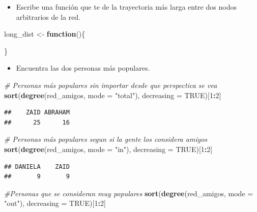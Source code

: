 \documentclass[
]{article}
\newenvironment{Shaded}{\begin{snugshade}}{\end{snugshade}}
\newcommand{\AttributeTok}[1]{\textcolor[rgb]{0.13,0.29,0.53}{#1}}
\newcommand{\CommentTok}[1]{\textcolor[rgb]{0.56,0.35,0.01}{\textit{#1}}}
\newcommand{\ConstantTok}[1]{\textcolor[rgb]{0.56,0.35,0.01}{#1}}
\newcommand{\ControlFlowTok}[1]{\textcolor[rgb]{0.13,0.29,0.53}{\textbf{#1}}}
\newcommand{\DecValTok}[1]{\textcolor[rgb]{0.00,0.00,0.81}{#1}}
\newcommand{\FunctionTok}[1]{\textcolor[rgb]{0.13,0.29,0.53}{\textbf{#1}}}
\newcommand{\NormalTok}[1]{#1}
\newcommand{\OtherTok}[1]{\textcolor[rgb]{0.56,0.35,0.01}{#1}}
\newcommand{\SpecialCharTok}[1]{\textcolor[rgb]{0.81,0.36,0.00}{\textbf{#1}}}
\newcommand{\StringTok}[1]{\textcolor[rgb]{0.31,0.60,0.02}{#1}}
\providecommand{\tightlist}{%
  \setlength{\itemsep}{0pt}\setlength{\parskip}{0pt}}
\begin{document}
\begin{itemize}
\tightlist
\item
  Escribe una función que te de la trayectoria más larga entre dos nodos
  arbitrarios de la red.
\end{itemize}

\begin{Shaded}
\begin{Highlighting}[]
\NormalTok{long\_dist }\OtherTok{\textless{}{-}} \ControlFlowTok{function}\NormalTok{()\{}
  
\NormalTok{\}}
\end{Highlighting}
\end{Shaded}

\begin{itemize}
\tightlist
\item
  Encuentra las dos personas más populares.
\end{itemize}

\begin{Shaded}
\begin{Highlighting}[]
\CommentTok{\# Personas más populares sin importar desde que perspectica se vea}
\FunctionTok{sort}\NormalTok{(}\FunctionTok{degree}\NormalTok{(red\_amigos, }\AttributeTok{mode =} \StringTok{"total"}\NormalTok{), }\AttributeTok{decreasing =} \ConstantTok{TRUE}\NormalTok{)[}\DecValTok{1}\SpecialCharTok{:}\DecValTok{2}\NormalTok{]}
\end{Highlighting}
\end{Shaded}

\begin{verbatim}
##    ZAID ABRAHAM 
##      25      16
\end{verbatim}

\begin{Shaded}
\begin{Highlighting}[]
\CommentTok{\# Personas más populares segun si la gente los considera amigos}
\FunctionTok{sort}\NormalTok{(}\FunctionTok{degree}\NormalTok{(red\_amigos, }\AttributeTok{mode =} \StringTok{"in"}\NormalTok{), }\AttributeTok{decreasing =} \ConstantTok{TRUE}\NormalTok{)[}\DecValTok{1}\SpecialCharTok{:}\DecValTok{2}\NormalTok{]}
\end{Highlighting}
\end{Shaded}

\begin{verbatim}
## DANIELA    ZAID 
##       9       9
\end{verbatim}

\begin{Shaded}
\begin{Highlighting}[]
\CommentTok{\#Personas que se consideran muy populares}
\FunctionTok{sort}\NormalTok{(}\FunctionTok{degree}\NormalTok{(red\_amigos, }\AttributeTok{mode =} \StringTok{"out"}\NormalTok{), }\AttributeTok{decreasing =} \ConstantTok{TRUE}\NormalTok{)[}\DecValTok{1}\SpecialCharTok{:}\DecValTok{2}\NormalTok{]}
\end{Highlighting}
\end{Shaded}
\end{document}
